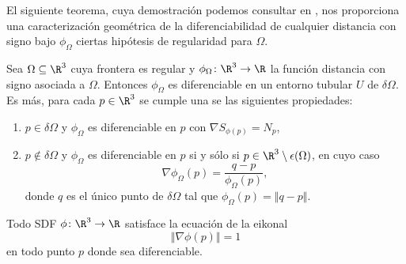 El siguiente teorema, cuya demostración podemos consultar en \cite{dif1}, nos proporciona una caracterización geométrica de la diferenciabilidad de cualquier distancia con signo bajo $\phi_{\Omega}$ ciertas hipótesis de regularidad para $\Omega$.
\begin{teorema}\label{teo:diff}
    Sea $\Omega \subseteq \R^3$ cuya frontera es regular y $\phi_{\Omega} \colon \R^3\to \R$ la función distancia con signo asociada a $\Omega$. Entonces $\phi_{\Omega}$ es diferenciable en un entorno tubular $U$ de $\delta \Omega$. Es más, para cada $p\in \R^3$ se cumple una se las siguientes propiedades:
    \begin{enumerate}
        \item $p\in \delta \Omega$ y $\phi_{\Omega}$ es diferenciable en $p$ con $\nabla S_{\phi(p)} = N_p$,
        \item $p\notin \delta \Omega$ y $\phi_{\Omega}$ es diferenciable en $p$ si y sólo si $p\in \R^3\setminus \epsilon(\Omega)$, en cuyo caso
        \begin{equation*}
            \nabla \phi_{\Omega}(p) = \frac{q-p}{\phi_{\Omega}(p)},
        \end{equation*}
        donde $q$ es el único punto de $\delta\Omega$ tal que $\phi_{\Omega}(p) = \Vert q-p\Vert$.
    \end{enumerate}
\end{teorema}

\begin{corolario}
    Todo SDF $\phi\colon \R^3\to \R$ satisface la ecuación de la eikonal 
    \begin{equation*}
        \Vert \nabla \phi(p)\Vert = 1
    \end{equation*}
    en todo punto $p$ donde sea diferenciable.
\end{corolario}
    


